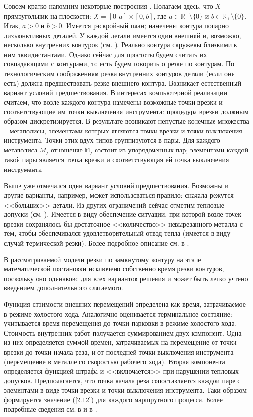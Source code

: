 \documentclass[10pt]{SPIIRAS_Proceedings}
\begin{document}
Совсем кратко напомним некоторые построения \cite[$\S$ 3.3]{4}.
Полагаем здесь, что $X$ -- прямоугольник на плоскости:
$X = [0,a] \times [0,b]$,
где $a \in \mathbb{R}_+ \setminus \{0\}$ и $b \in \mathbb{R}_+ \setminus \{0\}.$
Итак, $a > 0$ и $b > 0.$
Имеется раскройный план;
намечены контура попарно дизъюнктивных деталей.
У каждой детали имеется один внешний и,
возможно,
несколько внутренних контуров
(см. \cite[\S~3.2]{4}).
Реально контура окружены близкими к ним эквидистантами.
Однако сейчас для простоты
будем считать их совпадающими с контурами,
то есть будем говорить о резке по контурам.
По технологическим соображениям
резка внутренних контуров детали
(если они есть)
должна предшествовать резке внешнего контура.
Возникает естественный вариант условий предшествования.
В интересах компьютерной реализации считаем,
что возле каждого контура намечены возможные
точки врезки и соответствующие им точки выключения инструмента:
процедура врезки должным образом дискретизируется.
В результате возникают непустые конечные множества --
мегаполисы,
элементами которых являются точки врезки
и точки выключения инструмента.
Точки этих вдух типов группируются в пары.
Для каждого мегаполиса
$M_j$
отношение
$\mathbb{M}_j$
состоит из упорядоченных пар;
элементами каждой такой пары является
точка врезки
и соответствующая ей точка выключения инструмента.

Выше уже отмечался один вариант
условий предшествования.
Возможны и другие варианты,
например,
может использоваться правило:
сначала режутся <<большие>> детали.
Из других ограничений сейчас отметим
тепловые допуски
(см. \cite{18}).
Имеется в виду обеспечение ситуации,
при которой возле точек врезки сохранялось бы
достаточное <<количество>>
невырезанного металла с тем,
чтобы обеспечивался удовлетворительный отвод тепла
(имеется в виду случай термической резки).
Более подробное описание см. в \cite{18}.

В рассматриваемой модели резки
по замкнутому контуру
на этапе математической постановки исключено
собственно время резки контуров,
поскольку оно одинаково для всех вариантов решения
и может быть легко учтено введением
дополнительного слагаемого.

Функция стоимости внешних перемещений
определена как время,
затрачиваемое в режиме холостого хода.
Аналогично оценивается терминальное состояние:
учитывается время перемещения до точки парковки
в режиме холостого хода.
Стоимость внутренних работ
получается суммированием двух компонент.
Одна из них определяется суммой времен,
затрачиваемых на перемещение
от точки врезки до точки начала реза,
и от последней точки выключения инструмента
(перемещение в металле со скоростью рабочего хода).
Вторая компонента определяется функцией штрафа и
<<включается>> при нарушении тепловых допусков.
Предполагается, что точка начала реза
сопоставляется каждой паре с элементами в виде
точки врезки и точки выключения инструмента.
Таки образом
формируется значение (\ref{2.12})
для каждого маршрутного процесса.
Более подробные сведения см. в
\cite[часть 1, глава 3]{4}
и в
\cite{18}.
\end{document}
